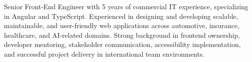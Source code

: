 

\begin{cvparagraph}

Senior Front-End Engineer with 5 years of commercial IT experience, specializing in Angular and TypeScript.
Experienced in designing and developing scalable, maintainable, and user-friendly web applications across automotive, insurance, healthcare, and AI-related domains.
Strong background in frontend ownership, developer mentoring, stakeholder communication, accessibility implementation, and successful project delivery in international team environments.
\end{cvparagraph}
